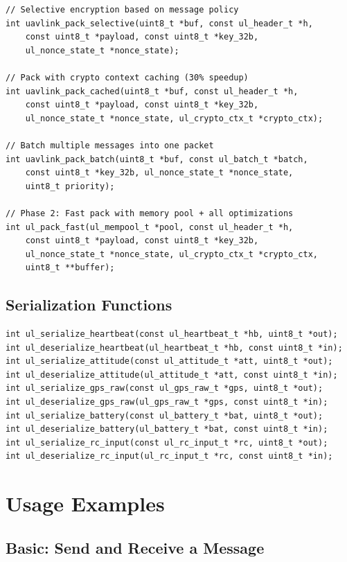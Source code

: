\documentclass[11pt,a4paper]{article}
\begin{document}
\begin{lstlisting}
// Selective encryption based on message policy
int uavlink_pack_selective(uint8_t *buf, const ul_header_t *h,
    const uint8_t *payload, const uint8_t *key_32b,
    ul_nonce_state_t *nonce_state);

// Pack with crypto context caching (30% speedup)
int uavlink_pack_cached(uint8_t *buf, const ul_header_t *h,
    const uint8_t *payload, const uint8_t *key_32b,
    ul_nonce_state_t *nonce_state, ul_crypto_ctx_t *crypto_ctx);

// Batch multiple messages into one packet
int uavlink_pack_batch(uint8_t *buf, const ul_batch_t *batch,
    const uint8_t *key_32b, ul_nonce_state_t *nonce_state,
    uint8_t priority);

// Phase 2: Fast pack with memory pool + all optimizations
int ul_pack_fast(ul_mempool_t *pool, const ul_header_t *h,
    const uint8_t *payload, const uint8_t *key_32b,
    ul_nonce_state_t *nonce_state, ul_crypto_ctx_t *crypto_ctx,
    uint8_t **buffer);
\end{lstlisting}

\subsection{Serialization Functions}

\begin{lstlisting}
int ul_serialize_heartbeat(const ul_heartbeat_t *hb, uint8_t *out);
int ul_deserialize_heartbeat(ul_heartbeat_t *hb, const uint8_t *in);
int ul_serialize_attitude(const ul_attitude_t *att, uint8_t *out);
int ul_deserialize_attitude(ul_attitude_t *att, const uint8_t *in);
int ul_serialize_gps_raw(const ul_gps_raw_t *gps, uint8_t *out);
int ul_deserialize_gps_raw(ul_gps_raw_t *gps, const uint8_t *in);
int ul_serialize_battery(const ul_battery_t *bat, uint8_t *out);
int ul_deserialize_battery(ul_battery_t *bat, const uint8_t *in);
int ul_serialize_rc_input(const ul_rc_input_t *rc, uint8_t *out);
int ul_deserialize_rc_input(ul_rc_input_t *rc, const uint8_t *in);
\end{lstlisting}

\section{Usage Examples}

\subsection{Basic: Send and Receive a Message}
\end{document}
